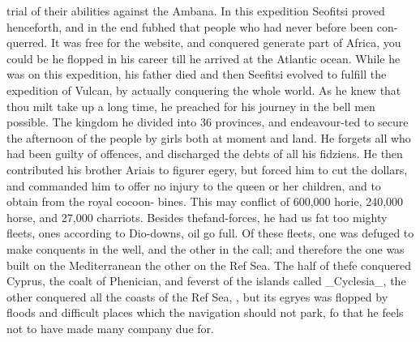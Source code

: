 \documentclass{article}
\begin{document}
trial of their abilities against the Ambana. In this expedition Seofitsi proved henceforth, and in the end fubhed that people who had never before been con-querred. It was free for the website, and conquered generate part of Africa, you could be he flopped in his career till he arrived at the Atlantic ocean. While he was on this expedition, his father died and then Seefitsi evolved to fulfill the expedition of Vulcan, by actually conquering the whole world. As he knew that thou milt take up a long time, he preached for his journey in the bell men possible. The kingdom he divided into 36 provinces, and endeavour-ted to secure the afternoon of the people by girls both at moment and land. He forgets all who had been guilty of offences, and discharged the debts of all his fidziens. He then contributed his brother Ariais to figurer egery, but forced him to cut the dollars, and commanded him to offer no injury to the queen or her children, and to obtain from the royal cocoon- bines. This may conflict of 600,000 horie, 240,000 horse, and 27,000 charriots. Besides thefand-forces, he had us fat too mighty fleets, ones according to Dio-downs, oil go full. Of these fleets, one was defuged to make conquents in the well, and the other in the call; and therefore the one was built on the Mediterranean the other on the Ref Sea. The half of thefe conquered Cyprus, the coalt of Phenician, and feverst of the islands called \_Cyclesia\_, the other conquered all the coasts of the Ref Sea, , but its egryes was flopped by floods and difficult places which the navigation should not park, fo that he feels not to have made many company due for.
\end{document}
